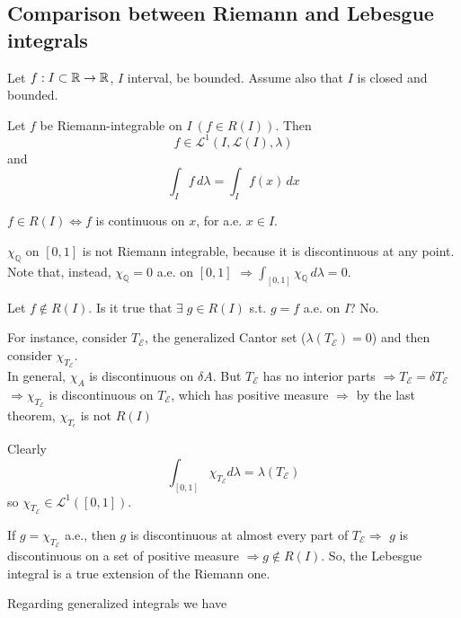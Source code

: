 \subsection{Comparison between Riemann and Lebesgue integrals}

Let \(f : I \subset \mathbb{R} \to \mathbb{R}\), \(I\) interval, be bounded. Assume also that \(I\) is closed and bounded.
\begin{theorem}
    Let \(f\) be Riemann-integrable on \(I \ (f \in R(I))\). Then 
    \[
        f\in \mathcal{L}^1(I, \mathcal{L}(I), \lambda)
    \]
    and 
    \[
        \int_I f \, d\lambda = \int_I f(x) \, dx
    \]
\end{theorem}
\begin{theorem}
    \(f \in R(I) \Leftrightarrow f\) is continuous on \(x\), for a.e. \(x \in I\).
\end{theorem}
\begin{example}
    \(\chi_{\mathbb{Q}}\) on \([0,1]\) is not Riemann integrable, because it is discontinuous at any point. Note that, instead, \(\chi_{\mathbb{Q}} = 0\) a.e. on \([0,1]\) \(\Rightarrow \int_{[0,1]} \chi_{\mathbb{Q}} \, d\lambda = 0\).
\end{example}
Let \(f \not \in R(I)\). Is it true that \(\exists \; g \in R(I)\) s.t. \(g = f\) a.e. on \(I\)? No.

For instance, consider \(T_{\mathcal{E}}\), the generalized Cantor set (\(\lambda(T_{\mathcal{E}}) = 0\)) and then consider \(\chi_{T_{\mathcal{E}}}\). \\
In general, \(\chi_{A}\) is discontinuous on \(\delta A\).  But \(T_{\mathcal{E}}\) has no interior parts \(\Rightarrow T_{\mathcal{E}} = \delta T_{\mathcal{E}}\) \(\Rightarrow \chi_{T_{\mathcal{E}}}\) is discontinuous on \(T_{\mathcal{E}}\), which has positive measure
\(\Rightarrow \) by the last theorem, \(\chi_{T_\epsilon}\) is not \(R(I)\)

Clearly 
\[
    \int_{[0,1]} \chi_{T_{\mathcal{E}}} d\lambda = \lambda(T_{\mathcal{E}})
\]
so \(\chi_{T_{\mathcal{E}}} \in \mathcal{L}^1([0,1])\).  

If \(g = \chi_{T_{\mathcal{E}}}\) a.e., then \(g\) is discontinuous at almost every part of \(T_{\mathcal{E}} \Rightarrow\) \(g\) is discontinuous on a set of positive measure \(\Rightarrow g \not \in R(I)\). 
So, the Lebesgue integral is a true extension of the Riemann one.

Regarding generalized integrals we have

